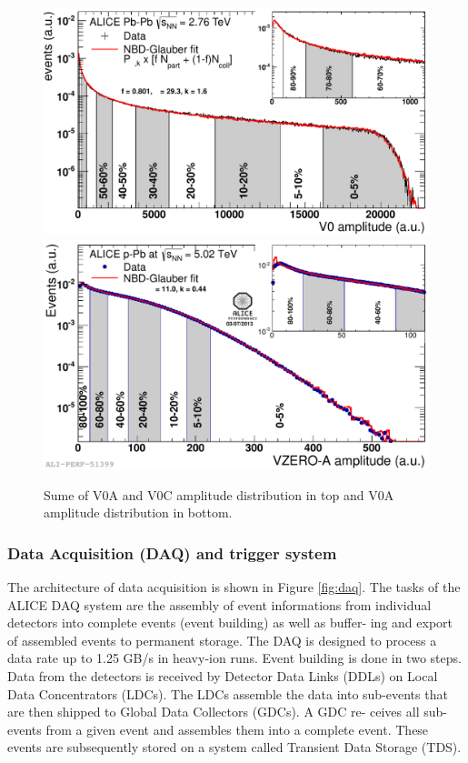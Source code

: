 \begin{figure}[htbp]
\begin{center}
\includegraphics[width=12.cm]{./Version1/FigChapter4/CentralityPbPb}
\hspace{1.0cm}
\includegraphics[width=12.cm]{./Version1/FigChapter4/CentralitypPb}
\caption{ Sume of V0A and V0C amplitude distribution in top and V0A amplitude distribution in bottom.}
\label{fig:centralityestimate}
\end{center}
\end{figure}

\newpage
\subsubsection{Data Acquisition (DAQ) and trigger system}\label{label:aliceDAQ}
The architecture of data acquisition is shown in Figure \ref{fig:daq}. The tasks of the ALICE DAQ system are the assembly of event informations from individual detectors into complete events (event building) as well as buffer- ing and export of assembled events to permanent storage. The DAQ is designed to process a data rate up to 1.25 GB/s in heavy-ion runs. Event building is done in two steps. Data from the detectors is received by Detector Data Links (DDLs) on Local Data Concentrators (LDCs). The LDCs assemble the data into sub-events that are then shipped to Global Data Collectors (GDCs). A GDC re- ceives all sub-events from a given event and assembles them into a complete event. These events are subsequently stored on a system called Transient Data Storage (TDS).

